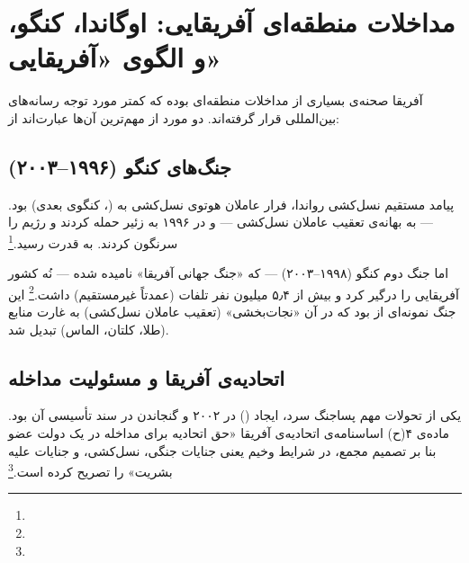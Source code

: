 \section{مداخلات منطقه‌ای آفریقایی: اوگاندا، کنگو، و الگوی «آفریقایی»}
\label{sec:ch10-africa}

آفریقا صحنه‌ی بسیاری از مداخلات منطقه‌ای بوده که کمتر مورد توجه رسانه‌های بین‌المللی قرار گرفته‌اند. دو مورد از مهم‌ترین آن‌ها عبارت‌اند از:

\subsection{جنگ‌های کنگو (۱۹۹۶–۲۰۰۳)}
\label{subsec:ch10-congo}

پیامد مستقیم نسل‌کشی رواندا، فرار عاملان هوتوی نسل‌کشی به  (، کنگوی بعدی) بود.  — به بهانه‌ی تعقیب عاملان نسل‌کشی — و  در ۱۹۹۶ به زئیر حمله کردند و رژیم  را سرنگون کردند.  به قدرت رسید.\footnote{}

اما جنگ دوم کنگو (۱۹۹۸–۲۰۰۳) — که «جنگ جهانی آفریقا» نامیده شده — نُه کشور آفریقایی را درگیر کرد و بیش از ۵٫۴ میلیون نفر تلفات (عمدتاً غیرمستقیم) داشت.\footnote{} این جنگ نمونه‌ای از  بود که در آن «نجات‌بخشی» (تعقیب عاملان نسل‌کشی) به غارت منابع (طلا، کلتان، الماس) تبدیل شد.

\subsection{اتحادیه‌ی آفریقا و مسئولیت مداخله}
\label{subsec:ch10-au}

یکی از تحولات مهم پساجنگ سرد، ایجاد  () در ۲۰۰۲ و گنجاندن  در سند تأسیسی آن بود. ماده‌ی ۴(ح) اساسنامه‌ی اتحادیه‌ی آفریقا «حق اتحادیه برای مداخله در یک دولت عضو بنا بر تصمیم مجمع، در شرایط وخیم یعنی جنایات جنگی، نسل‌کشی، و جنایات علیه بشریت» را تصریح کرده است.\footnote{}

